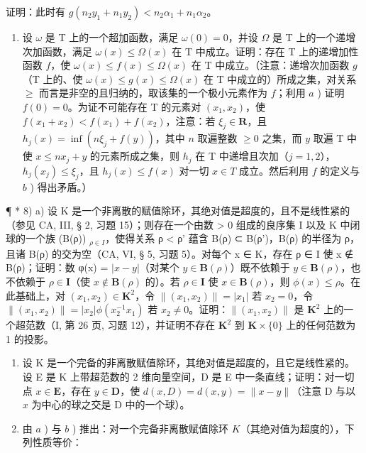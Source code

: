 证明：此时有 \(g(n_2y_1 + n_1y_2) < n_2\alpha_1 + n_1\alpha_2\)。

\begin{enumerate}
\def\labelenumi{\alph{enumi})}
\setcounter{enumi}{2}
\tightlist
\item
  设 \(\omega\) 是 T 上的一个超加函数，满足 \(\omega(0) = 0\)，并设 \(\Omega\) 是 T 上的一个递增次加函数，满足 \(\omega(x) \leqslant \Omega(x)\) 在 T 中成立。证明：存在 T 上的递增加性函数 \(f\)，使 \(\omega(x) \leqslant f(x) \leqslant \Omega(x)\) 在 T 中成立。（注意：递增次加函数 \(g\)（T 上的、使 \(\omega(x) \leqslant g(x) \leqslant \Omega(x)\) 在 T 中成立的）所成之集，对关系 \(\geqslant\) 而言是非空的且归纳的，取该集的一个极小元素作为 \(f\)；利用 \(a\) ) 证明 \(f(0) = 0\)。为证不可能存在 T 的元素对 \((x_1, x_2)\)，使 \(f(x_1 + x_2) < f(x_1) + f(x_2)\)，注意：若 \(\xi_j \in \mathbf{R}\)，且 \(h_j(x) = \inf(n\xi_j + f(y))\)，其中 \(n\) 取遍整数 \(\geqslant 0\) 之集，而 \(y\) 取遍 T 中使 \(x \leqslant nx_j + y\) 的元素所成之集，则 \(h_j\) 在 T 中递增且次加（\(j = 1, 2\)），\(h_j(x_j) \leqslant \xi_j\)，且 \(h_j(x) \leqslant f(x)\) 对一切 \(x \in T\) 成立。然后利用 \(f\) 的定义与 \(b\) ) 得出矛盾。）
\end{enumerate}

¶ * 8) a) 设 K 是一个非离散的赋值除环，其绝对值是超度的，且不是线性紧的（参见 CA, III, § 2, 习题 15）；则存在一个由数 > 0 组成的良序集 I 以及 K 中闭球的一个族 (B(ρ)) \(_{ρ \in I}\)，使得关系 ρ < ρ' 蕴含 B(ρ) ⊂ B(ρ')，B(ρ) 的半径为 ρ，且诸 B(ρ) 的交为空（CA, VI, § 5, 习题 5）。对每个 x ∈ K，存在 ρ ∈ I 使 x ∉ B(ρ)；证明：数 φ(x) = \(|x-y|\)（对某个 \(y \in \mathbf{B}(\rho)\)）既不依赖于 \(y \in \mathbf{B}(\rho)\)，也不依赖于 \(\rho \in \mathbf{I}\)（使 \(x \notin \mathbf{B}(\rho)\) 的）。若 \(\rho \in \mathbf{I}\) 使 \(x \in \mathbf{B}(\rho)\)，则 \(\phi(x) \leqslant \rho\)。在此基础上，对 \((x_1, x_2) \in \mathbf{K}^2\)，令 \(\| (x_1, x_2) \| = |x_1|\) 若 \(x_2 = 0\)，令 \(\| (x_1, x_2) \| = |x_2| \phi(x_2^{-1} x_1)\) 若 \(x_2 \neq 0\)。证明：\(\| (x_1, x_2) \|\) 是 \(\mathbf{K}^2\) 上的一个超范数（I, 第 26 页, 习题 12），并证明不存在 \(\mathbf{K}^2\) 到 \(\mathbf{K} \times \{0\}\) 上的任何范数为 1 的投影。

\begin{enumerate}
\def\labelenumi{\alph{enumi})}
\setcounter{enumi}{1}
\item
  设 K 是一个完备的非离散赋值除环，其绝对值是超度的，且它是线性紧的。设 E 是 K 上带超范数的 2 维向量空间，D 是 E 中一条直线；证明：对一切点 \(x \in \mathbf{E}\)，存在 \(y \in \mathbf{D}\)，使 \(d(x, D) = d(x, y) = \| x - y \|\)（注意 D 与以 \(x\) 为中心的球之交是 D 中的一个球）。
\item
  由 \(a\) ) 与 \(b\) ) 推出：对一个完备非离散赋值除环 \(K\)（其绝对值为超度的），下列性质等价：
\end{enumerate}

